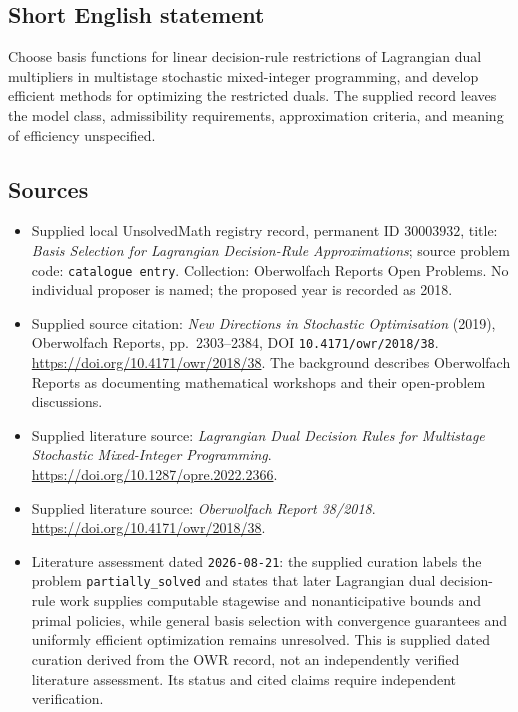 \documentclass[11pt]{article}
\begin{document}
\subsection{Short English statement}
Choose basis functions for linear decision-rule restrictions of Lagrangian dual multipliers in multistage stochastic mixed-integer programming, and develop efficient methods for optimizing the restricted duals. The supplied record leaves the model class, admissibility requirements, approximation criteria, and meaning of efficiency unspecified.
\subsection{Sources}
\begin{itemize}
\item Supplied local UnsolvedMath registry record, permanent ID \(30003932\), title: \emph{Basis Selection for Lagrangian Decision-Rule Approximations}; source problem code: \texttt{catalogue entry}. Collection: Oberwolfach Reports Open Problems. No individual proposer is named; the proposed year is recorded as 2018.
\item Supplied source citation: \emph{New Directions in Stochastic Optimisation} (2019), Oberwolfach Reports, pp.\ 2303--2384, DOI \texttt{10.4171/owr/2018/38}. \url{https://doi.org/10.4171/owr/2018/38}. The background describes Oberwolfach Reports as documenting mathematical workshops and their open-problem discussions.
\item Supplied literature source: \emph{Lagrangian Dual Decision Rules for Multistage Stochastic Mixed-Integer Programming}. \url{https://doi.org/10.1287/opre.2022.2366}.
\item Supplied literature source: \emph{Oberwolfach Report 38/2018}. \url{https://doi.org/10.4171/owr/2018/38}.
\item Literature assessment dated \texttt{2026-08-21}: the supplied curation labels the problem \texttt{partially\_solved} and states that later Lagrangian dual decision-rule work supplies computable stagewise and nonanticipative bounds and primal policies, while general basis selection with convergence guarantees and uniformly efficient optimization remains unresolved. This is supplied dated curation derived from the OWR record, not an independently verified literature assessment. Its status and cited claims require independent verification.
\end{itemize}
\end{document}
